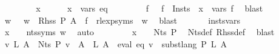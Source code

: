 \begin{isabellebody}
\ \ \isamarkupfalse%
\isanewline
\ \ \ \ \isamarkupfalse%
\ x\isanewline
\ \ \ \ \isamarkupfalse%
\ {\isachardoublequoteopen}x\ {\isasymin}\ vars\ eq{\isachardoublequoteclose}\isanewline
\ \ \ \ \isamarkupfalse%
\ {\isacharasterisk}{\kern0pt}\ \isamarkupfalse%
\ f\ \ {\isacharasterisk}{\kern0pt}{\isacharasterisk}{\kern0pt}{\isacharcolon}{\kern0pt}\ {\isachardoublequoteopen}f\ {\isasymin}\ {\isacharquery}{\kern0pt}Insts\ {\isasymand}\ x\ {\isasymin}\ vars\ f{\isachardoublequoteclose}\ \isamarkupfalse%
\ blast\isanewline
\ \ \ \ \isamarkupfalse%
\ \isamarkupfalse%
\ w\ \ {\isacharasterisk}{\kern0pt}{\isacharasterisk}{\kern0pt}{\isacharasterisk}{\kern0pt}{\isacharcolon}{\kern0pt}\ {\isachardoublequoteopen}w\ {\isasymin}\ Rhss\ P\ A\ {\isasymand}\ f\ {\isacharequal}{\kern0pt}\ rlexp{\isacharunderscore}{\kern0pt}syms\ {\isasymgamma}{\isacharprime}{\kern0pt}\ w{\isachardoublequoteclose}\ \isamarkupfalse%
\ blast\isanewline
\ \ \ \ \isamarkupfalse%
\ {\isacharasterisk}{\kern0pt}{\isacharasterisk}{\kern0pt}\ insts{\isacharprime}{\kern0pt}{\isacharunderscore}{\kern0pt}vars\ \isamarkupfalse%
\ {\isachardoublequoteopen}x\ {\isasymin}\ {\isasymgamma}{\isacharprime}{\kern0pt}\ {\isacharbackquote}{\kern0pt}\ nts{\isacharunderscore}{\kern0pt}syms\ w{\isachardoublequoteclose}\ \isamarkupfalse%
\ auto\isanewline
\ \ \ \ \isamarkupfalse%
\ {\isacharasterisk}{\kern0pt}{\isacharasterisk}{\kern0pt}{\isacharasterisk}{\kern0pt}\ \isamarkupfalse%
\ {\isachardoublequoteopen}x\ {\isasymin}\ {\isasymgamma}{\isacharprime}{\kern0pt}\ {\isacharbackquote}{\kern0pt}\ Nts\ P{\isachardoublequoteclose}\ \isamarkupfalse%
\ Nts{\isacharunderscore}{\kern0pt}def\ Rhss{\isacharunderscore}{\kern0pt}def\ \isamarkupfalse%
\ blast\isanewline
\ \ \isamarkupfalse%
\isanewline
\isanewline
\ \ \isamarkupfalse%
\ \isamarkupfalse%
\ {\isachardoublequoteopen}{\isasymforall}v\ L{\isachardot}{\kern0pt}\ {\isacharparenleft}{\kern0pt}{\isasymforall}A\ {\isasymin}\ Nts\ P{\isachardot}{\kern0pt}\ v\ {\isacharparenleft}{\kern0pt}{\isasymgamma}{\isacharprime}{\kern0pt}\ A{\isacharparenright}{\kern0pt}\ {\isacharequal}{\kern0pt}\ L\ A{\isacharparenright}{\kern0pt}\ {\isasymlongrightarrow}\ eval\ eq\ v\ {\isacharequal}{\kern0pt}\ subst{\isacharunderscore}{\kern0pt}lang\ P\ L\ A{\isachardoublequoteclose}\isanewline

\end{isabellebody}
